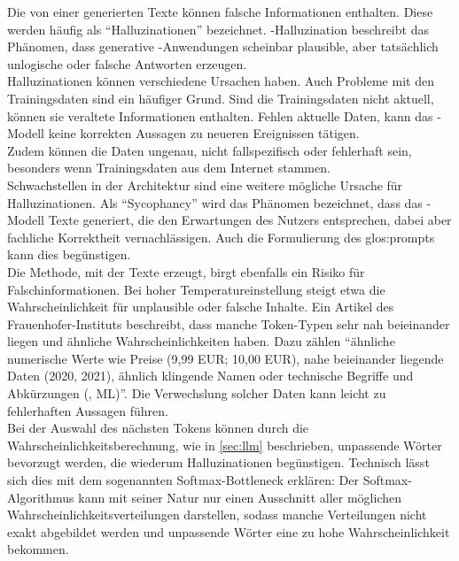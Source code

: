 \documentclass[../main.tex]{subfiles}
\begin{document}
Die von einer  generierten Texte können falsche Informationen enthalten. Diese werden häufig als "`Halluzinationen"' bezeichnet. -Halluzination beschreibt 
das Phänomen, dass generative -Anwendungen scheinbar plausible, aber tatsächlich unlogische oder falsche Antworten erzeugen\cite{hallucinationForewarning}.\\
Halluzinationen können verschiedene Ursachen haben. Auch Probleme mit den Trainingsdaten sind ein häufiger Grund. Sind die Trainingsdaten nicht aktuell,
können sie veraltete Informationen enthalten. Fehlen aktuelle Daten, kann das -Modell keine korrekten Aussagen zu neueren Ereignissen tätigen.\\ 
Zudem können die Daten ungenau, nicht fallspezifisch oder fehlerhaft sein, besonders wenn Trainingsdaten aus dem Internet stammen.\\ 
Schwachstellen in der Architektur sind eine weitere mögliche Ursache für Halluzinationen. Als "`Sycophancy"' wird das Phänomen bezeichnet, dass das -Modell Texte 
generiert, die den Erwartungen des Nutzers entsprechen, dabei aber fachliche Korrektheit vernachlässigen. Auch die Formulierung des \gls{glos:prompt}s kann dies begünstigen.\cite{allgemHalluzinationen} \\
Die Methode, mit der  Texte erzeugt, birgt ebenfalls ein Risiko für Falschinformationen. Bei hoher Temperatureinstellung steigt etwa die Wahrscheinlichkeit für 
unplausible oder falsche Inhalte. Ein Artikel des Frauenhofer-Instituts beschreibt, dass manche Token-Typen sehr nah beieinander liegen 
und ähnliche Wahrscheinlichkeiten haben. Dazu zählen "`ähnliche numerische Werte wie Preise (9,99 EUR; 10,00 EUR), nahe beieinander liegende Daten (2020, 2021), ähnlich klingende Namen oder 
technische Begriffe und Abkürzungen (, ML)"'\cite{halluzinationenFraunhofer}. Die Verwechslung solcher Daten kann leicht zu fehlerhaften Aussagen führen.\\
Bei der Auswahl des nächsten Tokens können durch die Wahrscheinlichkeitsberechnung, wie in \autoref{sec:llm}  beschrieben, unpassende Wörter bevorzugt werden, die wiederum Halluzinationen 
begünstigen. Technisch lässt sich dies mit dem sogenannten Softmax-Bottleneck erklären: Der Softmax-Algorithmus kann mit seiner Natur nur einen Ausschnitt aller möglichen 
Wahrscheinlichkeitsverteilungen darstellen, sodass manche Verteilungen nicht exakt abgebildet werden und unpassende Wörter eine zu hohe Wahrscheinlichkeit bekommen.\cite{softmax} \\
\end{document}
